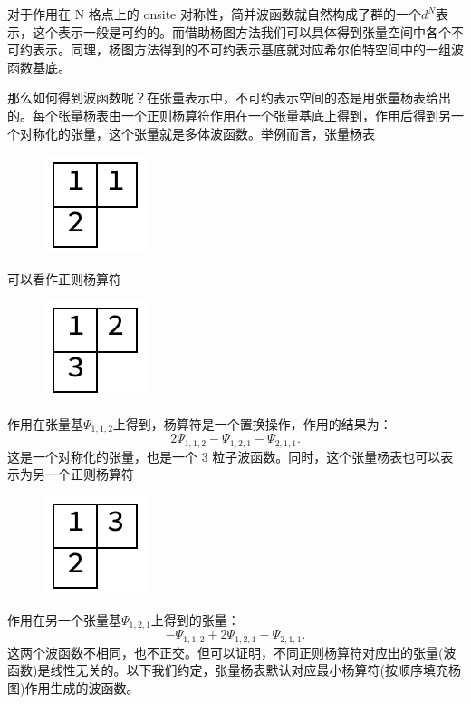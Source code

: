\documentclass[UTF8]{ctexart}
\begin{document}
对于作用在 N 格点上的 onsite 对称性，简并波函数就自然构成了群的一个$d^N$表示，这个表示一般是可约的。而借助杨图方法我们可以具体得到张量空间中各个不可约表示。同理，杨图方法得到的不可约表示基底就对应希尔伯特空间中的一组波函数基底。

那么如何得到波函数呢？在张量表示中，不可约表示空间的态是用张量杨表给出的。每个张量杨表由一个正则杨算符作用在一个张量基底上得到，作用后得到另一个对称化的张量，这个张量就是多体波函数。举例而言，张量杨表

\begin{figure}[H]
\begin{centering}
\includegraphics[width=.1\linewidth]{include/Y1}
\par\end{centering}
\end{figure}

\noindent 可以看作正则杨算符

\begin{figure}[H]
\begin{centering}
\includegraphics[width=.1\linewidth]{include/Y2}
\par\end{centering}
\end{figure}

\noindent 作用在张量基$\Psi_{1,1,2}$上得到，杨算符是一个置换操作，作用的结果为：
\begin{equation}
	2 \Psi_{1,1,2} - \Psi_{1,2,1} - \Psi_{2,1,1}. 
\end{equation}
这是一个对称化的张量，也是一个 3 粒子波函数。同时，这个张量杨表也可以表示为另一个正则杨算符

\begin{figure}[H]
\begin{centering}
\includegraphics[width=.1\linewidth]{include/Y3}
\par\end{centering}
\end{figure}

\noindent 作用在另一个张量基$\Psi_{1,2,1}$上得到的张量：
\begin{equation}
	-\Psi_{1, 1, 2} + 2 \Psi_{1, 2, 1} - \Psi_{2, 1, 1}. 
\end{equation}
这两个波函数不相同，也不正交。但可以证明，不同正则杨算符对应出的张量(波函数)是线性无关的。以下我们约定，张量杨表默认对应最小杨算符(按顺序填充杨图)作用生成的波函数。
\end{document}
